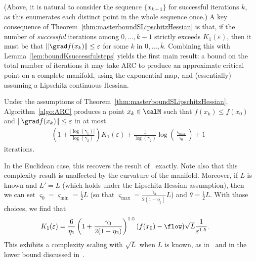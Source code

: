 (Above, it is natural to consider the sequence $\{x_{k+1}\}$ for successful iterations $k$, as this enumerates each distinct point in the whole sequence once.) %
A key consequence of Theorem~\ref{thm:masterboundSLipschitzHessian} is that, if the number of \emph{successful} iterations among $0, \ldots, \bar k-1$ strictly exceeds $K_1(\varepsilon)$, then it must be that $\|\grad f(x_k)\| \leq \varepsilon$ for some $k$ in $0, \ldots, \bar k$. Combining this with Lemma~\ref{lem:boundKsuccessfulsteps} yields the first main result: a bound on the total number of iterations it may take ARC to produce an approximate critical point on a complete manifold, using the exponential map, and (essentially) assuming a Lipschitz continuous Hessian.
%
%
%
%
%
% 
%
%
%
%
%
%
\begin{corollary} \label{cor:mastercorollary}
	Under the assumptions of Theorem~\ref{thm:masterboundSLipschitzHessian}, Algorithm~\ref{algo:ARC} produces a point $x_k \in \calM$ such that $f(x_k) \leq f(x_0)$ and $\|\grad f(x_k)\| \leq \varepsilon$ in at most
	\begin{align*}
		\left(1 + \frac{|\log(\gamma_1)|}{\log(\gamma_2)}\right) K_1(\varepsilon) + \frac{1}{\log(\gamma_2)} \log\left(\frac{\varsigma_{\max}}{\varsigma_0}\right) + 1
	\end{align*}
	iterations.
\end{corollary}
In the Euclidean case, this recovers the result of~\citep{bcgmt} exactly. Note also that this complexity result is unaffected by the curvature of the manifold. Moreover, if $L$ is known and $L' = L$ (which holds under the Lipschitz Hessian assumption), then we can set $\varsigma_0 = \varsigma_{\min} = \frac{1}{2}L$ (so that $\varsigma_{\max} = \frac{\gamma_3}{2(1-\eta_2)}L$) and $\theta = \frac{1}{2}L$. With those choices, we find that
\begin{align}
	K_1(\varepsilon) & = \frac{6}{\eta_1} \left( 1 + \frac{\gamma_3}{2(1-\eta_2)} \right)^{1.5} (f(x_0) - \flow) \sqrt{L} \frac{1}{\varepsilon^{1.5}}.
\end{align}
This exhibits a complexity scaling with $\sqrt{L}$ when $L$ is known, as in~\citep{nesterov2006cubic} and in the lower bound discussed in~\citep{carmon2017lower}.

